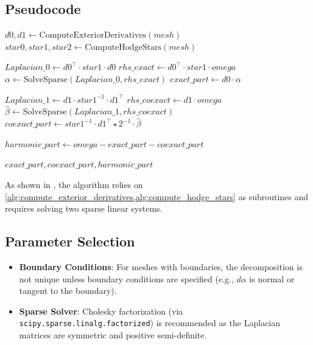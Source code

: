 

\subsection{Pseudocode}
\begin{algorithm}
\caption{Hodge Decomposition of a 1-Form}\label{alg:hodge_decompose}
\begin{algorithmic}
    \State $d0, d1 \gets \text{ComputeExteriorDerivatives}(mesh)$ 
    \State $star0, star1, star2 \gets \text{ComputeHodgeStars}(mesh)$ 

    \State $Laplacian\_0 \gets d0^\top \cdot star1 \cdot d0$
    \State $rhs\_exact \gets d0^\top \cdot star1 \cdot omega$
    \State $\alpha \gets \text{SolveSparse}(Laplacian\_0, rhs\_exact)$
    \State $exact\_part \gets d0 \cdot \alpha$

    \State $Laplacian\_1 \gets d1 \cdot star1^{-1} \cdot d1^\top$
    \State $rhs\_coexact \gets d1 \cdot omega$
    \State $\hat{\beta} \gets \text{SolveSparse}(Laplacian\_1, rhs\_coexact)$
    \State $coexact\_part \gets star1^{-1} \cdot d1^\top \star2^{-1} \cdot \hat{\beta}$

    \State $harmonic\_part \gets omega - exact\_part - coexact\_part$

    \Return $exact\_part, coexact\_part, harmonic\_part$
\EndFunction
\end{algorithmic}
\end{algorithm}
As shown in , the algorithm relies on \cref{alg:compute_exterior_derivatives,alg:compute_hodge_stars} as subroutines and requires solving two sparse linear systems.

\subsection{Parameter Selection}
\begin{itemize}
    \item \textbf{Boundary Conditions}: For meshes with boundaries, the decomposition is not unique unless boundary conditions are specified (e.g., $d\alpha$ is normal or tangent to the boundary).
    \item \textbf{Sparse Solver}: Cholesky factorization (via \texttt{scipy.sparse.linalg.factorized}) is recommended as the Laplacian matrices are symmetric and positive semi-definite.
\end{itemize}

